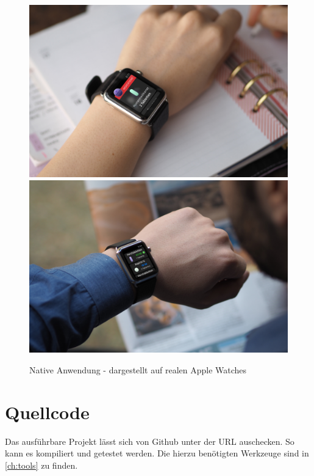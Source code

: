 \begin{figure}
	\caption{Native Anwendung - dargestellt auf realen Apple Watches}
	\label{fig:watch-real}
	\centering
	\includegraphics[width=1\textwidth]{04_realisation/screenshots/Mockup-Generated-by-Dunnnk.jpg}
	\includegraphics[width=1\textwidth]{04_realisation/screenshots/Mockup-Generated-by-Dunnnk-2.jpg}
	\end{figure}
\section{Quellcode}
Das ausführbare Projekt lässt sich von Github unter der URL\cite{Schmidt:repoCode} auschecken. So kann es kompiliert und getestet werden. Die hierzu benötigten Werkzeuge sind in \ref{ch:tools} zu finden.


